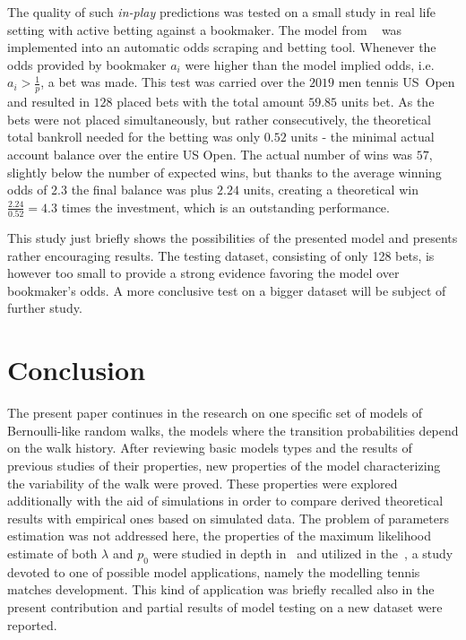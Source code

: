 \documentclass[runningheads]{CMSIM}
\begin{document}
    The quality of such \emph{in-play} predictions was tested on a small study in real life setting with active betting against a bookmaker.
    The model from ~\cite{ja2019mathsport_proc} was implemented into an automatic odds scraping and betting tool.
    Whenever the odds provided by bookmaker $a_{i}$  were higher than the model implied odds, i.e. $a_{i}>\frac{1}{p}$, a bet was made.
    This test was carried over the $2019$ men tennis US~Open and resulted in $128$ placed bets with the total amount $59.85$ units bet.
    As the bets were not placed simultaneously, but rather consecutively, the theoretical total bankroll needed for the betting was only $0.52$ units - the minimal actual account balance over the entire US Open.
    The actual number of wins was $57$, slightly below the number of expected wins, but thanks to the average winning odds of $2.3$ the final balance was plus $2.24$ units,
    creating a theoretical win $\frac{2.24}{0.52}=4.3$ times the investment, which is an outstanding performance.

    This study just briefly shows the possibilities of the presented model and presents rather encouraging results.
    The testing dataset, consisting of only 128 bets, is however too small to provide a strong evidence favoring the model over bookmaker's odds.
    A more conclusive test on a bigger dataset will be subject of further study.


    \section{Conclusion}\label{sec:conclusion}

    The present paper continues in the research on one specific set of
    models of Bernoulli-like random walks, the models where the transition
    probabilities depend on the walk history.
    After reviewing basic models
    types and the results of previous studies of their properties, new
    properties of the model characterizing the variability of the walk
    were proved.
    These properties were explored additionally with the aid
    of simulations in order to compare derived theoretical results with
    empirical ones based on simulated data.
    The problem of parameters
    estimation was not addressed here, the properties of the maximum likelihood
    estimate of both $\lambda$ and $p_{0}$ were studied in depth in~\cite{ja2019apmat} and utilized in the~\cite{ja2019mathsport_proc},
    a study devoted to one of possible model applications, namely the
    modelling tennis matches development.
    This kind of application was briefly recalled also in the present contribution and partial results of model testing on a new dataset were reported.

    
    
\end{document}
